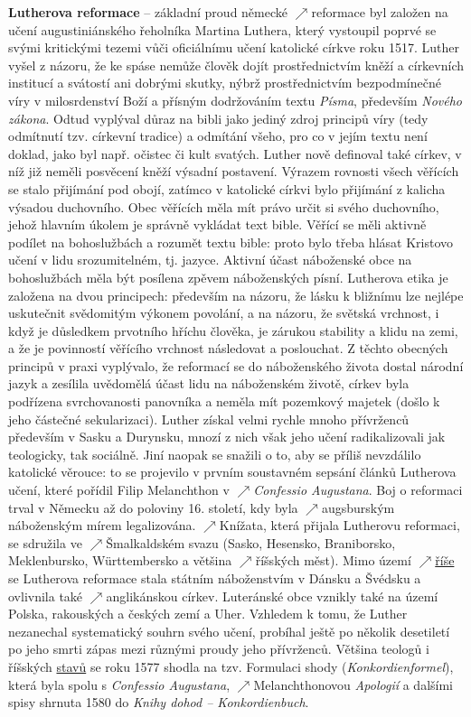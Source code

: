 \documentclass{article}
\begin{document}
  {\bf Lutherova reformace} -- základní proud německé $\nearrow$reformace byl založen na učení augustiniánského řeholníka Martina Luthera, který vystoupil poprvé se svými kritickými tezemi vůči oficiálnímu učení katolické církve roku 1517. Luther vyšel z názoru, že ke spáse nemůže člověk dojít prostřednictvím kněží a církevních institucí a svátostí ani dobrými skutky, nýbrž prostřednictvím bezpodmínečné víry v milosrdenství Boží a přísným dodržováním textu {\it Písma}, především {\it Nového zákona}. Odtud vyplýval důraz na bibli jako jediný zdroj principů víry (tedy odmítnutí tzv. církevní tradice) a odmítání všeho, pro co v jejím textu není doklad, jako byl např. očistec či kult svatých. Luther nově definoval také církev, v níž již neměli posvěcení kněží výsadní postavení. Výrazem rovnosti všech věřících se stalo přijímání pod obojí, zatímco v katolické církvi bylo přijímání z kalicha výsadou duchovního. Obec věřících měla mít právo určit si svého duchovního, jehož hlavním úkolem je správně vykládat text bible. Věřící se měli aktivně podílet na bohoslužbách a rozumět textu bible: proto bylo třeba hlásat Kristovo učení v lidu srozumitelném, tj.  jazyce. Aktivní účast náboženské obce na bohoslužbách měla být posílena zpěvem náboženských písní. Lutherova etika je založena na dvou principech: především na názoru, že lásku k bližnímu lze nejlépe uskutečnit svědomitým výkonem povolání, a na názoru, že světská vrchnost, i když je důsledkem prvotního hříchu člověka, je zárukou stability a klidu na zemi, a že je povinností věřícího vrchnost následovat a poslouchat. Z těchto obecných principů v praxi vyplývalo, že reformací se do náboženského života dostal národní jazyk a zesílila uvědomělá účast lidu na náboženském životě, církev byla podřízena svrchovanosti panovníka a neměla mít pozemkový majetek (došlo k jeho částečné sekularizaci). Luther získal velmi rychle mnoho přívrženců především v Sasku a Durynsku, mnozí z nich však jeho učení radikalizovali jak teologicky, tak sociálně. Jiní naopak se snažili o to, aby se příliš nevzdálilo katolické věrouce: to se projevilo v prvním soustavném sepsání článků Lutherova učení, které pořídil Filip Melanchthon v $\nearrow${\it Confessio Augustana}. Boj o reformaci trval v Německu až do poloviny 16. století, kdy byla $\nearrow$augsburským náboženským mírem legalizována. $\nearrow$Knížata, která přijala Lutherovu reformaci, se sdružila ve $\nearrow$Šmalkaldském svazu (Sasko, Hesensko, Braniborsko, Meklenbursko, Württembersko a většina $\nearrow$říšských měst). Mimo území $\nearrow$\hyperref[sec:rise]{říše} se Lutherova reformace stala státním náboženstvím v Dánsku a Švédsku a ovlivnila také $\nearrow$anglikánskou církev. Luteránské obce vznikly také na území Polska, rakouských a českých zemí a Uher. Vzhledem k tomu, že Luther nezanechal systematický souhrn svého učení, probíhal ještě po několik desetiletí po jeho smrti zápas mezi různými proudy jeho přívrženců. Většina teologů i říšských \hyperref[sec:stavy]{stavů} se roku 1577 shodla na tzv. Formulaci shody ({\it Konkordienformel}), která byla spolu s {\it Confessio Augustana}, $\nearrow$Melanchthonovou {\it Apologií} a dalšími spisy shrnuta 1580 do {\it Knihy dohod -- Konkordienbuch}.
\end{document}
